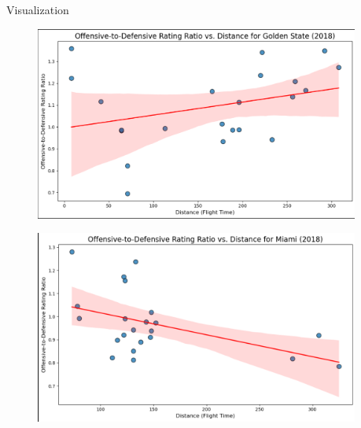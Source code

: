 \documentclass[final]{beamer}
\newlength{\sepwidth}
\newlength{\colwidth}
\newcommand{\separatorcolumn}{\begin{column}{\sepwidth}\end{column}}
\begin{document}
\begin{frame}[t]
\begin{columns}[t]
\begin{column}{\colwidth}
\begin{block}{Visualization}
    \begin{figure}[h!]
        \centering
        \begin{minipage}{0.8\textwidth} %
            \centering
            \includegraphics[width=\textwidth]{GoldenS.png} %
            \label{fig:first_image}
        \end{minipage} \hfill
        \begin{minipage}{0.8\textwidth} %
            \centering
            \includegraphics[width=\textwidth]{MiamiH.png} %
            \label{fig:second_image}
        \end{minipage}
    \end{figure}

\end{block}




\end{column}

\separatorcolumn


\end{columns}
\end{frame}
\end{document}

